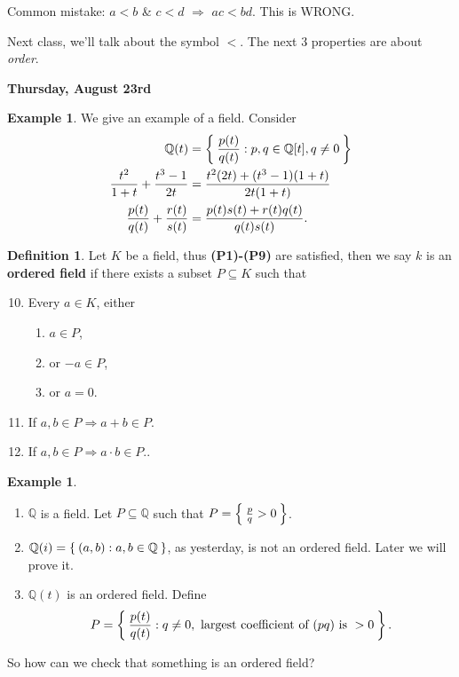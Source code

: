 \documentclass[12pt]{amsbook}
\theoremstyle{plain}
\numberwithin{section}{chapter}
\numberwithin{equation}{chapter}
\theoremstyle{definition}
\newtheorem{Def}[theorem]{Definition}
\newtheorem{Ex}[theorem]{Example}
\theoremstyle{remark}
\theoremstyle{plain}
\newcommand{\sub}{\subseteq}
\newcommand{\Q}{\mathbb{Q}}
\newcommand{\bee}{\begin{equation}\begin{aligned}}
\newcommand{\eee}{\end{aligned}\end{equation}}
\newcommand{\fracc}{\frac}
\begin{document}
Common mistake:
$a < b$ \& $c < d$ $\Rightarrow$ $ac < bd$. This is WRONG. 

Next class, we'll talk about the symbol $<$. The next 3 properties are about \textit{order}. 

\textbf{Thursday, August 23rd}

\begin{Ex}
We give an example of a field. Consider 
\bee
\Q(t) &= \Set{\fracc{p(t)}{q(t)}:p,q \in \Q[t], q \neq 0}\\
\fracc{t^2}{1 + t} + \fracc{t^3 - 1}{2t} &= \fracc{t^2(2t) + (t^3 - 1)(1 + t)}{2t(1 + t)}\\
\fracc{p(t)}{q(t)} + \fracc{r(t)}{s(t)} &= \fracc{p(t)s(t) + r(t)q(t)}{q(t)s(t)}. 
\eee
\end{Ex}

\begin{Def}
Let $K$ be a field, thus \textbf{(P1)-(P9)} are satisfied, then we say $k$ is an \textbf{ordered field} if there exists a subset $P \sub K$ such that
\begin{enumerate}[label=(\textbf{P\arabic*)}]
\setcounter{enumi}{9}
\item Every $a \in K$, either
\begin{enumerate}
\item $a \in P$,
\item or $-a \in P$,
\item or $a = 0$.
\end{enumerate}
\item If $a,b \in P \Rightarrow a + b \in P$.
\item If $a,b \in P \Rightarrow a\cdot b \in P.$. 
\end{enumerate}
\end{Def}

\begin{Ex}
\begin{enumerate}
\item $\Q$ is a field. Let $P \sub \Q$ such that $P = \Set{\fracc{p}{q}>0}$. 
\item $\Q(i) = \Set{(a,b): a,b \in \Q}$, as yesterday, is not an ordered field. Later we will prove it. 
\item $\Q(t)$ is an ordered field. Define
\bee
P  = \Set{\fracc{p(t)}{q(t)}:q \neq 0, \text{ largest coefficient of }(pq) \text{ is }>0}. 
\eee
\end{enumerate}
\end{Ex}

So how can we check that something is an ordered field? \\
\end{document}
